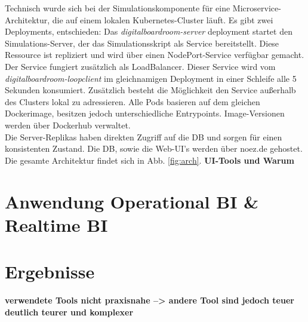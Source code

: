 Technisch wurde sich bei der Simulationskomponente für eine Microservice-Architektur, die auf einem lokalen Kubernetes-Cluster läuft. Es gibt zwei Deployments, entschieden: Das \textit{digitalboardroom-server} deployment startet den Simulations-Server, der das Simulationsskript als Service bereitstellt. Diese Ressource ist repliziert und wird über einen NodePort-Service verfügbar gemacht. Der Service fungiert zusätzlich als LoadBalancer. Dieser Service wird vom \textit{digitalboardroom-loopclient} im gleichnamigen Deployment in einer Schleife alle 5 Sekunden konsumiert. Zusätzlich besteht die Möglichkeit den Service außerhalb des Clusters lokal zu adressieren. Alle Pods basieren auf dem gleichen Dockerimage, besitzen jedoch unterschiedliche Entrypoints. Image-Versionen werden über Dockerhub verwaltet.
\\Die Server-Replikas haben direkten Zugriff auf die \ac{DB} und sorgen für einen konsistenten Zustand.
Die \ac{DB}, sowie die Web-UI's werden über noez.de gehostet. Die gesamte Architektur findet sich in Abb. \ref{fig:arch}.
\textbf{UI-Tools und Warum}

\section{Anwendung Operational BI & Realtime BI} \label{abs:anwOP}
\section{Ergebnisse}
\textbf{verwendete Tools nicht praxisnahe --> andere Tool sind jedoch teuer deutlich teurer und komplexer}